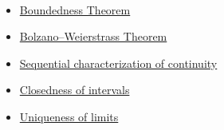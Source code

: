 \begin{remark*}[Dependencies]~\\
\begin{itemize}
  \item \hyperref[thm:boundedness-theorem]{Boundedness Theorem}
  \item \hyperref[thm:bolzano-weierstrass]{Bolzano--Weierstrass Theorem}
  \item \hyperref[def:continuous-function]{Sequential characterization of continuity}
  \item \hyperref[thm:closed-interval-is-closed]{Closedness of intervals}
  \item \hyperref[thm:uniqueness-of-limits]{Uniqueness of limits}
\end{itemize}
\end{remark*}
